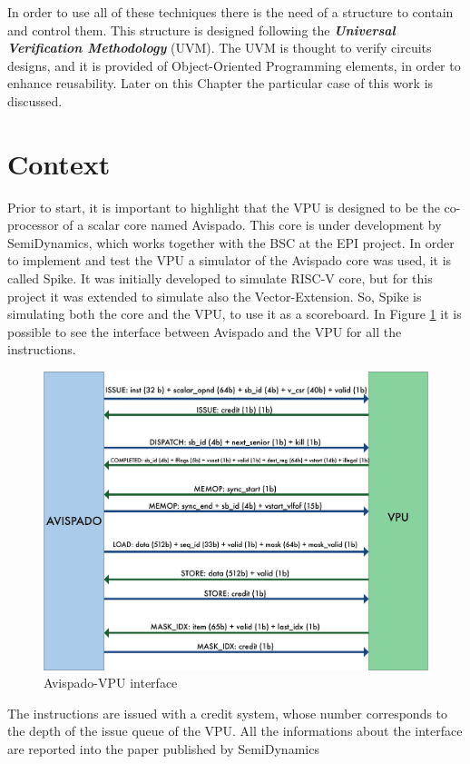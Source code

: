 In order to use all of these techniques there is the need of a structure to contain and control them.
This structure is designed following the \textbf{\emph{Universal Verification Methodology}} (UVM). The UVM is thought to verify circuits designs, and it is provided of Object-Oriented Programming elements, in order to enhance reusability. Later on this Chapter the particular case of this work is discussed.

\section{Context}
Prior to start, it is important to highlight that the VPU is designed to be the co-processor of a scalar core named Avispado. This core is under development by SemiDynamics, which works together with the BSC at the EPI project. In order to implement and test the VPU a simulator of the Avispado core was used, it is called Spike. It was initially developed to simulate RISC-V core, but for this project it was extended to simulate also the Vector-Extension. So, Spike is simulating both the core and the VPU, to use it as a scoreboard.
In Figure \ref{avi-vpu} it is possible to see the interface between Avispado and the VPU for all the instructions.

\begin{figure}[H]
    \centering
    \includegraphics[scale = 0.6]{Chapter_1/img/avi-vpu.png}
    \caption{Avispado-VPU interface}
    \label{avi-vpu}
\end{figure}


The instructions are issued with a credit system, whose number corresponds to the depth of the issue queue of the VPU. All the informations about the interface are reported into the paper published by SemiDynamics~\cite{avi-vpu}



